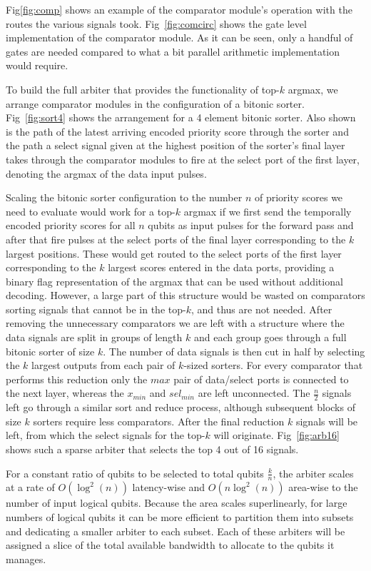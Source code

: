 \documentclass[conference]{IEEEtran}
\begin{document}
Fig\ref{fig:comp} shows an example of the comparator module's operation with the routes the 
various signals took.
Fig~\ref{fig:comcirc} shows the gate level implementation of the comparator module.
As it can be seen, only a handful of gates are needed compared to what a bit parallel arithmetic implementation would require.

To build the full arbiter that provides the functionality of top-$k$ argmax, we arrange comparator modules in the configuration of a bitonic sorter.
Fig~\ref{fig:sort4} shows the arrangement for a 4 element bitonic sorter.
Also shown is the path of the latest arriving encoded priority score through the sorter and the path a select signal given at the highest position of the sorter's final layer takes through the comparator modules to fire at the select port of the first layer, denoting the argmax of the data input pulses.

Scaling the bitonic sorter configuration to the number $n$ of priority scores we need to evaluate would work for a top-$k$ argmax if we first send the temporally encoded priority scores for all $n$ qubits as input pulses for the forward pass and after that fire pulses at the select ports of the final layer corresponding to the $k$ largest positions.
These would get routed to the select ports of the first layer corresponding to the $k$ largest scores entered in the data ports, providing a binary flag representation of the argmax that can be used without additional decoding.
However, a large part of this structure would be wasted on comparators sorting signals that cannot be in the top-$k$, and thus are not needed.
After removing the unnecessary comparators we are left with a structure where the data signals are split in groups of length $k$ and each group goes through a full bitonic sorter of size $k$.
The number of data signals is then cut in half by selecting the $k$ largest outputs from each pair of $k$-sized sorters.
For every comparator that performs this reduction only the $max$ pair of data/select ports is connected to the next layer, whereas the $x_{min}$ and $sel_{min}$ are left unconnected.
The $\frac{n}{2}$ signals left go through a similar sort and reduce process, although subsequent blocks of size $k$ sorters require less comparators. 
After the final reduction $k$ signals will be left, from which the select signals for the top-$k$ will originate.
Fig~\ref{fig:arb16} shows such a sparse arbiter that selects the top 4 out of 16 signals.

For a constant ratio of qubits to be selected to total qubits $\frac{k}{n}$, the arbiter scales at a rate of $O(\log^2(n))$ latency-wise and $O(n\log^2(n))$ area-wise to the number of input logical qubits.
Because the area scales superlinearly, for large numbers of logical qubits it can be more efficient to partition them into subsets and dedicating a smaller arbiter to each subset.
Each of these arbiters will be assigned a slice of the total available bandwidth to allocate to the qubits it manages.
\end{document}
